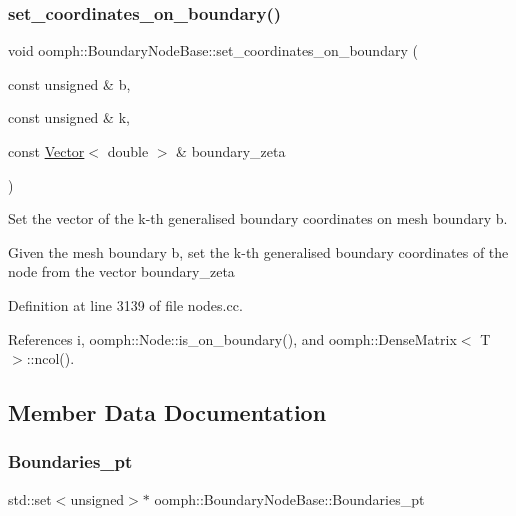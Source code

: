 \subsubsection{\texorpdfstring{set\+\_\+coordinates\+\_\+on\+\_\+boundary()}{set\_coordinates\_on\_boundary()}\hspace{0.1cm}{\footnotesize\ttfamily [2/2]}}
{\footnotesize\ttfamily void oomph\+::\+Boundary\+Node\+Base\+::set\+\_\+coordinates\+\_\+on\+\_\+boundary (\begin{DoxyParamCaption}\item[{const unsigned \&}]{b,  }\item[{const unsigned \&}]{k,  }\item[{const \hyperlink{classoomph_1_1Vector}{Vector}$<$ double $>$ \&}]{boundary\+\_\+zeta }\end{DoxyParamCaption})}



Set the vector of the k-\/th generalised boundary coordinates on mesh boundary b. 

Given the mesh boundary b, set the k-\/th generalised boundary coordinates of the node from the vector boundary\+\_\+zeta 

Definition at line 3139 of file nodes.\+cc.



References i, oomph\+::\+Node\+::is\+\_\+on\+\_\+boundary(), and oomph\+::\+Dense\+Matrix$<$ T $>$\+::ncol().



\subsection{Member Data Documentation}
\mbox{\label{classoomph_1_1BoundaryNodeBase_a18163a5bc2e0b6dfc487e249f3c24dd6}} 
\subsubsection{\texorpdfstring{Boundaries\+\_\+pt}{Boundaries\_pt}}
{\footnotesize\ttfamily std\+::set$<$unsigned$>$$\ast$ oomph\+::\+Boundary\+Node\+Base\+::\+Boundaries\+\_\+pt\hspace{0.3cm}{\ttfamily [private]}}



